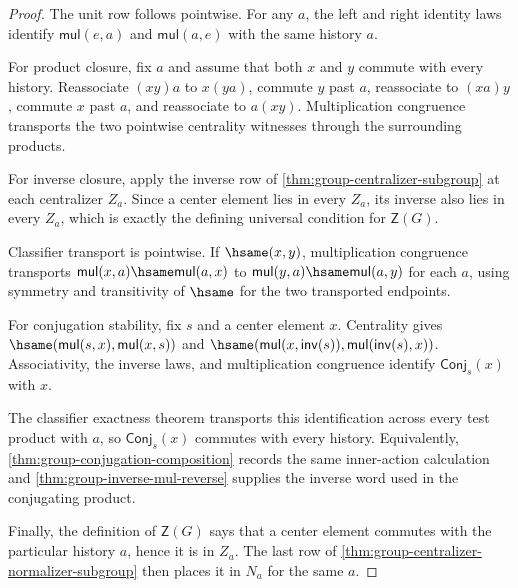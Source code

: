 \begin{proof}
The unit row follows pointwise. For any $a$, the left and right identity laws
identify $\mathsf{mul}(e,a)$ and $\mathsf{mul}(a,e)$ with the same history $a$.

For product closure, fix $a$ and assume that both $x$ and $y$ commute with every
history. Reassociate $(xy)a$ to $x(ya)$, commute $y$ past $a$, reassociate to
$(xa)y$, commute $x$ past $a$, and reassociate to $a(xy)$. Multiplication
congruence transports the two pointwise centrality witnesses through the
surrounding products.

For inverse closure, apply the inverse row of
\autoref{thm:group-centralizer-subgroup} at each centralizer $Z_a$. Since a
center element lies in every $Z_a$, its inverse also lies in every $Z_a$, which
is exactly the defining universal condition for $\mathsf{Z}(G)$.

Classifier transport is pointwise. If $\hsame(x,y)$, multiplication congruence
transports $\mathsf{mul}(x,a)\hsame\mathsf{mul}(a,x)$ to
$\mathsf{mul}(y,a)\hsame\mathsf{mul}(a,y)$ for each $a$, using symmetry and
transitivity of $\hsame$ for the two transported endpoints.

For conjugation stability, fix $s$ and a center element $x$. Centrality gives
$\hsame(\mathsf{mul}(s,x),\mathsf{mul}(x,s))$ and
$\hsame(\mathsf{mul}(x,\mathsf{inv}(s)),
\mathsf{mul}(\mathsf{inv}(s),x))$. Associativity, the inverse laws, and
multiplication congruence identify $\mathsf{Conj}_s(x)$ with $x$.

The classifier exactness theorem transports this identification across every
test product with $a$, so $\mathsf{Conj}_s(x)$ commutes with every history.
Equivalently, \autoref{thm:group-conjugation-composition} records the same
inner-action calculation and \autoref{thm:group-inverse-mul-reverse} supplies
the inverse word used in the conjugating product.

Finally, the definition of $\mathsf{Z}(G)$ says that a center element commutes
with the particular history $a$, hence it is in $Z_a$. The last row of
\autoref{thm:group-centralizer-normalizer-subgroup} then places it in
$N_a$ for the same $a$.
\end{proof}

